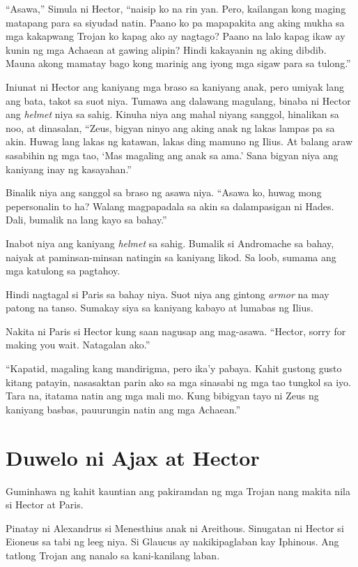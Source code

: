\documentclass[12pt,letterpaper]{report}
\begin{document}
``Asawa,'' Simula ni Hector, ``naisip ko na rin yan. Pero, kailangan kong maging matapang para sa siyudad natin. Paano ko pa mapapakita ang aking mukha sa mga kakapwang Trojan ko kapag ako ay nagtago? Paano na lalo kapag ikaw ay kunin ng mga Achaean at gawing alipin? Hindi kakayanin ng aking dibdib. Mauna akong mamatay bago kong marinig ang iyong mga sigaw para sa tulong.''

Iniunat ni Hector ang kaniyang mga braso sa kaniyang anak, pero umiyak lang ang bata, takot sa suot niya. Tumawa ang dalawang magulang, binaba ni Hector ang \textit{helmet} niya sa sahig. Kinuha niya ang mahal niyang sanggol, hinalikan sa noo, at dinasalan, ``Zeus, bigyan ninyo ang aking anak ng lakas lampas pa sa akin. Huwag lang lakas ng katawan, lakas ding mamuno ng Ilius. At balang araw sasabihin ng mga tao, `Mas magaling ang anak sa ama.' Sana bigyan niya ang kaniyang inay ng kasayahan.''

Binalik niya ang sanggol sa braso ng asawa niya. ``Asawa ko, huwag mong pepersonalin to ha? Walang magpapadala sa akin sa dalampasigan ni Hades. Dali, bumalik na lang kayo sa bahay.''

Inabot niya ang kaniyang \textit{helmet} sa sahig. Bumalik si Andromache sa bahay, naiyak at paminsan-minsan natingin sa kaniyang likod. Sa loob, sumama ang mga katulong sa pagtahoy.

Hindi nagtagal si Paris sa bahay niya. Suot niya ang gintong \textit{armor} na may patong na tanso. Sumakay siya sa kaniyang kabayo at lumabas ng Ilius.

Nakita ni Paris si Hector kung saan nagusap ang mag-asawa. ``Hector, sorry for making you wait. Natagalan ako.''

``Kapatid, magaling kang mandirigma, pero ika'y pabaya. Kahit gustong gusto kitang patayin, nasasaktan parin ako sa mga sinasabi ng mga tao tungkol sa iyo. Tara na, itatama natin ang mga mali mo. Kung bibigyan tayo ni Zeus ng kaniyang basbas, pauurungin natin ang mga Achaean.''

\pagebreak
\chapter{Duwelo ni Ajax at Hector}

Guminhawa ng kahit kauntian ang pakiramdan ng mga Trojan nang makita nila si Hector at Paris.

Pinatay ni Alexandrus si Menesthius anak ni Areithous. Sinugatan ni Hector si Eioneus sa tabi ng leeg niya. Si Glaucus ay nakikipaglaban kay Iphinous. Ang tatlong Trojan ang nanalo sa kani-kanilang laban.
\end{document}
